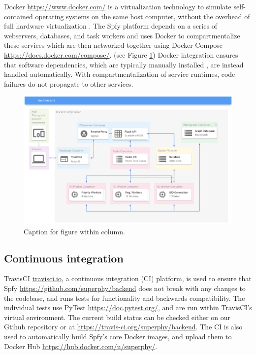 \documentclass{article}
\begin{document}
Docker \url{https://www.docker.com/} is a virtualization technology to simulate self-contained operating systems on the same host computer, without the overhead of full hardware virtualization \cite{felter2015updated}.
The Spfy platform depends on a series of webservers, databases, and task workers and uses Docker to compartmentalize these services which are then networked together using Docker-Compose \url{https://docs.docker.com/compose/}.
(see Figure \ref{fig-docker})
Docker integration ensures that software dependencies, which are typically manually installed \cite{doi:10.1093/bioinformatics/btu153,laing2010pan,inouye2014srst2,naccache2014cloud}, are instead handled automatically. With compartmentalization of service runtimes, code failures do not propagate to other services.

\begin{figure}[!hb]
\begin{center}
\includegraphics[width=\textwidth]{images/docker}
\end{center}
\caption{Caption for figure within column.}
\label{fig-docker}
\end{figure}

\subsection{Continuous integration}

TravisCI \url{travisci.io}, a continuous integration (CI) platform, is used to ensure that Spfy \url{https://github.com/superphy/backend} does not break with any changes to the codebase, and runs tests for functionality and backwards compatibility.
The individual tests use PyTest \url{https://doc.pytest.org/}, and are run within TravisCI's virtual environment. The current build status can be checked either on our Gtihub repository or at \url{https://travis-ci.org/superphy/backend}.
The CI is also used to automatically build Spfy's core Docker images, and upload them to Docker Hub \url{https://hub.docker.com/u/superphy/}.
\end{document}
